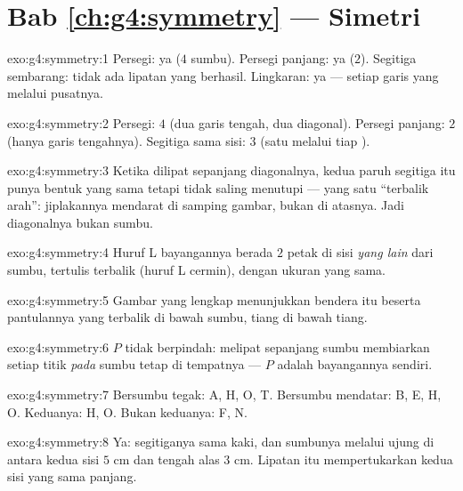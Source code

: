 \section*{Bab \ref{ch:g4:symmetry} --- Simetri}

\begin{solution}{exo:g4:symmetry:1}
Persegi: ya ($4$ sumbu). Persegi panjang: ya ($2$). Segitiga
sembarang: tidak ada lipatan yang berhasil. Lingkaran: ya --- setiap garis yang melalui pusatnya.
\end{solution}

\begin{solution}{exo:g4:symmetry:2}
Persegi: $4$ (dua garis tengah, dua diagonal). Persegi panjang: $2$
(hanya garis tengahnya). Segitiga sama sisi: $3$ (satu melalui tiap
).
\end{solution}

\begin{solution}{exo:g4:symmetry:3}
Ketika dilipat sepanjang diagonalnya, kedua paruh segitiga itu punya
bentuk yang sama tetapi tidak saling menutupi --- yang satu
``terbalik arah'': jiplakannya mendarat di samping gambar, bukan di
atasnya. Jadi diagonalnya bukan sumbu.
\end{solution}

\begin{solution}{exo:g4:symmetry:4}
Huruf L bayangannya berada $2$ petak di sisi \emph{yang lain} dari
sumbu, tertulis terbalik (huruf L cermin), dengan ukuran yang sama.
\end{solution}

\begin{solution}{exo:g4:symmetry:5}
Gambar yang lengkap menunjukkan bendera itu beserta pantulannya yang
terbalik di bawah sumbu, tiang di bawah tiang.
\end{solution}

\begin{solution}{exo:g4:symmetry:6}
$P$ tidak berpindah: melipat sepanjang sumbu membiarkan setiap titik
\emph{pada} sumbu tetap di tempatnya --- $P$ adalah bayangannya sendiri.
\end{solution}

\begin{solution}{exo:g4:symmetry:7}
Bersumbu tegak: A, H, O, T. Bersumbu mendatar: B, E, H, O.
Keduanya: H, O. Bukan keduanya: F, N.
\end{solution}

\begin{solution}{exo:g4:symmetry:8}
Ya: segitiganya sama kaki, dan sumbunya melalui ujung di antara
kedua sisi $5$ cm dan tengah alas $3$ cm. Lipatan itu
mempertukarkan kedua sisi yang sama panjang.
\end{solution}


